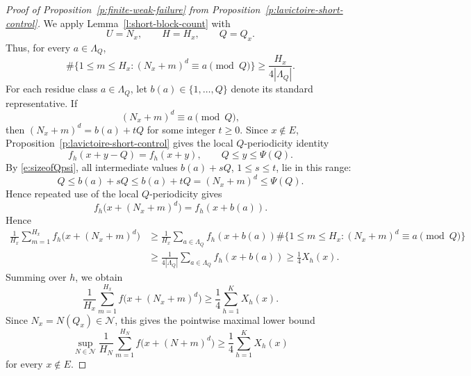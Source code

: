 \documentclass[12pt,leqno]{amsart}
\numberwithin{equation}{section}
\numberwithin{counter2}{section}
\theoremstyle{definition}
\theoremstyle{plain}
\begin{document}
\begin{proof}[Proof of Proposition~\ref{p:finite-weak-failure} from
	Proposition~\ref{p:lavictoire-short-control}]
We apply Lemma~\ref{l:short-block-count} with
\[
U=N_x,
\qquad
H=H_x,
\qquad
Q=Q_x.
\]
Thus, for every \(a\in\Lambda_Q\),
\[
\#\{1\leq m\leq H_x:(N_x+m)^d\equiv a\pmod Q\}
\geq
\frac{H_x}{4|\Lambda_Q|}.
\]
For each residue class \(a\in\Lambda_Q\), let \(b(a)\in\{1,\dots,Q\}\)
denote its standard representative. If
\[
(N_x+m)^d\equiv a\pmod Q,
\]
then $(N_x+m)^d=b(a)+tQ$
for some integer \(t\geq0\). Since \(x\notin E\), Proposition~\ref{p:lavictoire-short-control}
gives the local \(Q\)-periodicity identity
\[
f_h(x+y-Q)=f_h(x+y),
\qquad
Q\leq y\leq \Psi(Q).
\]
By \eqref{e:sizeofQpsi}, all intermediate values \(b(a)+sQ\), \(1\leq s\leq t\),
lie in this range:
\[
Q\leq b(a)+sQ\leq b(a)+tQ=(N_x+m)^d\leq\Psi(Q).
\]
Hence repeated use of the local \(Q\)-periodicity gives
\[
f_h\bigl(x+(N_x+m)^d\bigr)
=
f_h(x+b(a)).
\]
Hence
\begin{align*}
\frac1{H_x}\sum_{m=1}^{H_x} f_h\bigl(x+(N_x+m)^d\bigr)
&\geq
\frac1{H_x}
\sum_{a\in\Lambda_Q}
f_h(x+b(a))
\#\{1\leq m\leq H_x:(N_x+m)^d\equiv a\pmod Q\} \\
&\geq
\frac1{4|\Lambda_Q|}
\sum_{a\in\Lambda_Q} f_h(x+b(a)) \geq
\frac14 X_h(x).
\end{align*}
	Summing over \(h\), we obtain
	\[
	\frac1{H_x}
	\sum_{m=1}^{H_x}
	f\bigl(x+(N_x+m)^d\bigr)
	\geq
	\frac14\sum_{h=1}^K X_h(x).
	\]
	Since \(N_x=N(Q_x)\in\mathcal N\), this gives the pointwise maximal lower bound
	\[
	\sup_{N\in\mathcal N}
	\frac1{H_N}
	\sum_{m=1}^{H_N}
	f\bigl(x+(N+m)^d\bigr)
	\geq
	\frac14\sum_{h=1}^K X_h(x)
	\]
	for every \(x\notin E\).
	

\end{proof}
\end{document}

